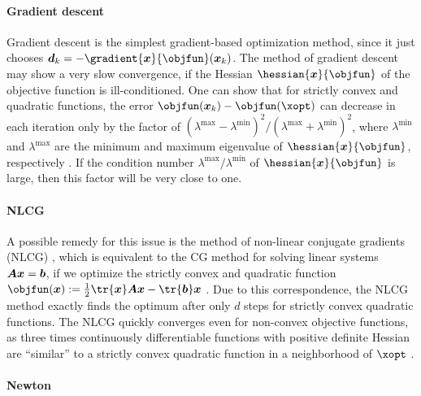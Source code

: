 \paragraph{Gradient descent}

Gradient descent
is the simplest gradient-based optimization method,
since it just chooses $\*d_k = -\gradient{\*x}{\objfun}(\*x_k)$.
The method of gradient descent may show a very slow convergence,
if the Hessian $\hessian{\*x}{\objfun}$
of the objective function is ill-conditioned.
One can show that for strictly convex and quadratic functions,
the error $\objfun(\*x_k) - \objfun(\xopt)$
can decrease in each iteration only by the factor of
$(\lambda^{\max} - \lambda^{\min})^2/(\lambda^{\max} + \lambda^{\min})^2$,
where $\lambda^{\min}$ and $\lambda^{\max}$ are the minimum and maximum
eigenvalue of $\hessian{\*x}{\objfun}$, respectively
\cite{Ulbrich12Nichtlineare}.
If the condition number
$\lambda^{\max}/\lambda^{\min}$
of $\hessian{\*x}{\objfun}$ is large,
then this factor will be very close to one.

\paragraph{NLCG}

A possible remedy for this issue is the method of
non-linear conjugate gradients (NLCG)
,
which is equivalent to the CG method for solving \spd linear systems
${\boldsymbol{A}} {\boldsymbol{x}} = {\boldsymbol{b}}$,
if we optimize the strictly convex and quadratic function
$\objfun(\*x) := \frac{1}{2} \tr{\*x} \mat{A} \*x - \tr{\*b} \*x$
.
Due to this correspondence,
the NLCG method exactly finds the optimum after only $d$ steps
for strictly convex quadratic functions.
The NLCG quickly converges even for non-convex objective functions,
as three times continuously differentiable functions
with positive definite Hessian are ``similar'' to a
strictly convex quadratic function in a neighborhood of $\xopt$
\cite{Valentin14Hierarchische}.

\paragraph{Newton}

